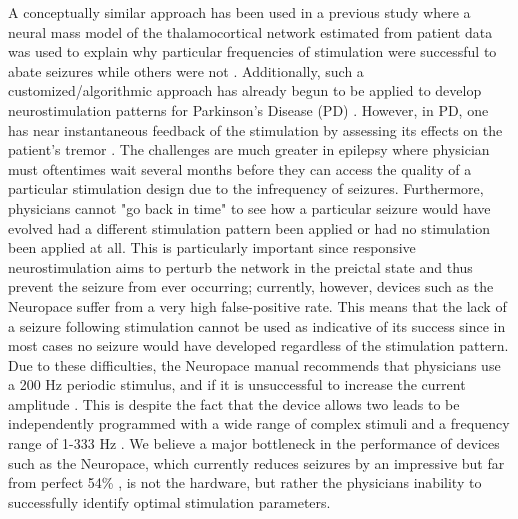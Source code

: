 \documentclass[journal,twoside,web]{ieeecolor}
\begin{document}
A conceptually similar approach has been used in a previous study where a neural mass model of the thalamocortical network estimated from patient data was used to explain why particular frequencies of stimulation were successful to abate seizures while others were not \cite{wendling13}.
Additionally, such a customized/algorithmic approach has already begun to be applied to develop neurostimulation patterns for Parkinson's Disease (PD) \cite{holt14,grill14patent,brocker17,pena17}.
However, in PD, one has near instantaneous feedback of the stimulation by assessing its effects on the patient's tremor \cite{grill13}.
The challenges are much greater in epilepsy where physician must oftentimes wait several months before they can access the quality of a particular stimulation design due to the infrequency of seizures.
Furthermore, physicians cannot "go back in time" to see how a particular seizure would have evolved had a different stimulation pattern been applied or had no stimulation been applied at all.
This is particularly important since responsive neurostimulation aims to perturb the network in the preictal state and thus prevent the seizure from ever occurring; currently, however, devices such as the Neuropace suffer from a very high false-positive rate.
This means that the lack of a seizure following stimulation cannot be used as indicative of its success since in most cases no seizure would have developed regardless of the stimulation pattern.
Due to these difficulties, the Neuropace manual recommends that physicians use a 200 Hz periodic stimulus, and if it is unsuccessful to increase the current amplitude \cite{NP}.
This is despite the fact that the device allows two leads to be independently programmed with a wide range of complex stimuli and a frequency range of 1-333 Hz \cite{sun08}.
We believe a major bottleneck in the performance of devices such as the Neuropace, which currently reduces seizures by an impressive but far from perfect 54\% \cite{heck14}, is not the hardware, but rather the physicians inability to successfully identify optimal stimulation parameters.
\end{document}
